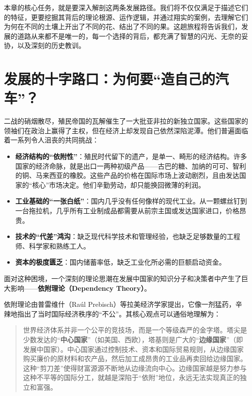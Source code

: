 本章的核心任务，就是要深入解剖这两条发展路径。我们将不仅仅满足于描述它们的特征，更要挖掘其背后的理论根源、运作逻辑，并通过翔实的案例，去理解它们为何在不同的土壤上开出了不同的花、结出了不同的果。这趟旅程将告诉我们，发展的道路从来都不是唯一的，每一个选择的背后，都充满了智慧的闪光、无奈的妥协，以及深刻的历史教训。

\section{发展的十字路口：为何要“造自己的汽车”？}

二战的硝烟散尽，殖民帝国的瓦解催生了一大批亚非拉的新独立国家。这些国家的领袖们在政治上赢得了主权，但在经济上却发现自己依然深陷泥潭。他们普遍面临着一系列令人沮丧的共同挑战：

\begin{itemize}
    \item \textbf{经济结构的“依附性”}：殖民时代留下的遗产，是单一、畸形的经济结构。许多国家的经济命脉，就是出口一两种初级产品——古巴的糖、加纳的可可、智利的铜、马来西亚的橡胶。这些产品的价格在国际市场上波动剧烈，且由发达国家的“核心”市场决定。他们辛勤劳动，却只能换回微薄的利润。
    \item \textbf{工业基础的“一张白纸”}：国内几乎没有任何像样的现代工业。从一颗螺丝钉到一台拖拉机，几乎所有工业制成品都需要从前宗主国或发达国家进口，价格昂贵。
    \item \textbf{技术的“代差”鸿沟}：缺乏现代科学技术和管理经验，也缺乏足够数量的工程师、科学家和熟练工人。
    \item \textbf{资本的极度匮乏}：国内储蓄率低，缺乏工业化所必需的巨额启动资金。
\end{itemize}

面对这种困境，一个深刻的理论思潮在发展中国家的知识分子和决策者中产生了巨大影响——\textbf{依附理论（Dependency Theory）}。

依附理论由普雷维什（Raúl Prebisch）等拉美经济学家提出，它像一剂猛药，辛辣地指出了当时国际经济秩序的“不公”。其核心观点可以通俗地理解为：

\begin{quote}
世界经济体系并非一个公平的竞技场，而是一个等级森严的金字塔。塔尖是少数发达的“\textbf{中心国家}”（如美国、西欧），塔基则是广大的“\textbf{边缘国家}”（即发展中国家）。中心国家通过控制技术、资本和国际贸易规则，从边缘国家购买廉价的原材料和农产品，然后加工成昂贵的工业品再卖回给边缘国家。这种“剪刀差”使得财富源源不断地从边缘流向中心。边缘国家越是努力参与这种不平等的国际分工，就越是深陷于“依附”地位，永远无法实现真正的独立和富强。
\end{quote}

